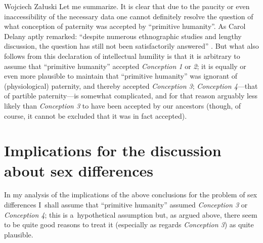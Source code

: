 \begin{artengenv}{Wojciech Załuski}
Let me summarize. It is clear that due to the paucity or even inaccessibility of the necessary data one cannot definitely resolve the question of what conception of paternity was accepted by ``primitive humanity''. As Carol Delany aptly remarked: ``despite numerous ethnographic studies and lengthy discussion, the question has still not been satisfactorily answered''
\parencite[][p.495]{delaney_meaning_1986}. %
 But what also follows from this declaration of intellectual humility is that it is arbitrary to assume that ``primitive humanity'' accepted \textit{Conception 1} or \textit{2}; it is equally or even more plausible to maintain that ``primitive humanity'' was ignorant of (physiological) paternity, and thereby accepted \textit{Conception 3}; \textit{Conception 4}---that of partible paternity---is somewhat complicated, and for that reason arguably less likely than \textit{Conception 3} to have been accepted by our ancestors (though, of course, it cannot be excluded that it was in fact accepted).

\section{Implications for the discussion about sex differences}\label{zal:sec4}
In my analysis of the implications of the above conclusions for the problem of sex differences I~shall assume that ``primitive humanity'' assumed \textit{Conception 3} or \textit{Conception 4}; this is a~hypothetical assumption but, as argued above, there seem to be quite good reasons to treat it (especially as regards \textit{Conception 3}) as quite plausible.


\end{artengenv}
